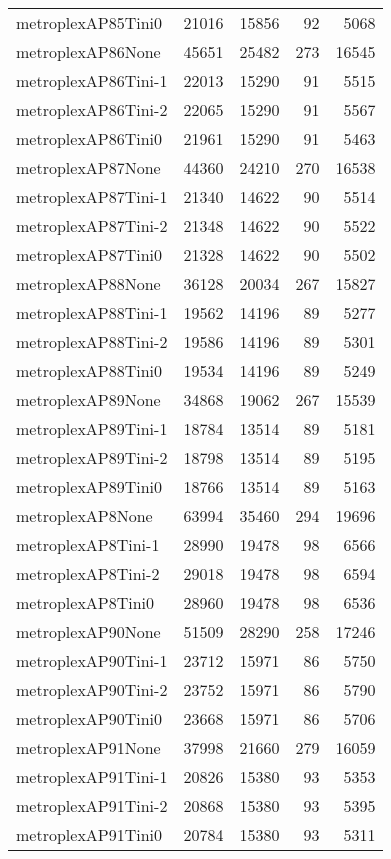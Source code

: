 \begin{longtable}{lrrrr}
metroplexAP85Tini0 & 21016 & 15856 & 92 & 5068 \\
metroplexAP86None & 45651 & 25482 & 273 & 16545 \\
metroplexAP86Tini-1 & 22013 & 15290 & 91 & 5515 \\
metroplexAP86Tini-2 & 22065 & 15290 & 91 & 5567 \\
metroplexAP86Tini0 & 21961 & 15290 & 91 & 5463 \\
metroplexAP87None & 44360 & 24210 & 270 & 16538 \\
metroplexAP87Tini-1 & 21340 & 14622 & 90 & 5514 \\
metroplexAP87Tini-2 & 21348 & 14622 & 90 & 5522 \\
metroplexAP87Tini0 & 21328 & 14622 & 90 & 5502 \\
metroplexAP88None & 36128 & 20034 & 267 & 15827 \\
metroplexAP88Tini-1 & 19562 & 14196 & 89 & 5277 \\
metroplexAP88Tini-2 & 19586 & 14196 & 89 & 5301 \\
metroplexAP88Tini0 & 19534 & 14196 & 89 & 5249 \\
metroplexAP89None & 34868 & 19062 & 267 & 15539 \\
metroplexAP89Tini-1 & 18784 & 13514 & 89 & 5181 \\
metroplexAP89Tini-2 & 18798 & 13514 & 89 & 5195 \\
metroplexAP89Tini0 & 18766 & 13514 & 89 & 5163 \\
metroplexAP8None & 63994 & 35460 & 294 & 19696 \\
metroplexAP8Tini-1 & 28990 & 19478 & 98 & 6566 \\
metroplexAP8Tini-2 & 29018 & 19478 & 98 & 6594 \\
metroplexAP8Tini0 & 28960 & 19478 & 98 & 6536 \\
metroplexAP90None & 51509 & 28290 & 258 & 17246 \\
metroplexAP90Tini-1 & 23712 & 15971 & 86 & 5750 \\
metroplexAP90Tini-2 & 23752 & 15971 & 86 & 5790 \\
metroplexAP90Tini0 & 23668 & 15971 & 86 & 5706 \\
metroplexAP91None & 37998 & 21660 & 279 & 16059 \\
metroplexAP91Tini-1 & 20826 & 15380 & 93 & 5353 \\
metroplexAP91Tini-2 & 20868 & 15380 & 93 & 5395 \\
metroplexAP91Tini0 & 20784 & 15380 & 93 & 5311 \\

\end{longtable}
